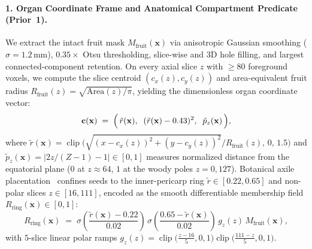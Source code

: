\documentclass[10pt,a4paper]{article}
\renewcommand{\_}{\origunderscore\allowbreak}
\begin{document}
\paragraph{1. Organ Coordinate Frame and Anatomical Compartment Predicate (Prior~1).}
We extract the intact fruit mask $M_{\text{fruit}}(\mathbf{x})$ via anisotropic Gaussian smoothing ($\sigma = 1.2\,\text{mm}$), $0.35\times$ Otsu thresholding, slice-wise and 3D hole filling, and largest connected-component retention. On every axial slice $z$ with $\ge 80$ foreground voxels, we compute the slice centroid $(c_x(z), c_y(z))$ and area-equivalent fruit radius $R_{\text{fruit}}(z) = \sqrt{\text{Area}(z)/\pi}$, yielding the dimensionless organ coordinate vector:
\begin{equation}
    \mathbf{c}(\mathbf{x}) \;=\; \Bigl(\,\tilde{r}(\mathbf{x}),\;\; (\tilde{r}(\mathbf{x}) - 0.43)^2,\;\; \tilde{p}_z(\mathbf{x})\,\Bigr),
    \label{eq:organ_gps_coords}
\end{equation}
where $\tilde{r}(\mathbf{x}) = \operatorname{clip}\bigl(\sqrt{(x - c_x(z))^2 + (y - c_y(z))^2}/R_{\text{fruit}}(z),\, 0,\, 1.5\bigr)$ and $\tilde{p}_z(\mathbf{x}) = |2z/(Z-1) - 1| \in [0, 1]$ measures normalized distance from the equatorial plane ($0$ at $z \approx 64$, $1$ at the woody poles $z=0, 127$). Botanical axile placentation~\cite{richardson2011kiwidev,guo2013kiwivascular} confines seeds to the inner-pericarp ring $\tilde{r} \in [0.22, 0.65]$ and non-polar slices $z \in [16, 111]$, encoded as the smooth differentiable membership field $R_{\text{ring}}(\mathbf{x}) \in [0, 1]$:
\begin{equation}
    R_{\text{ring}}(\mathbf{x}) \;=\; \sigma\!\left(\frac{\tilde{r}(\mathbf{x}) - 0.22}{0.02}\right)\, \sigma\!\left(\frac{0.65 - \tilde{r}(\mathbf{x})}{0.02}\right)\, g_z(z)\, M_{\text{fruit}}(\mathbf{x}),
    \label{eq:soft_ring}
\end{equation}
with $5$-slice linear polar ramps $g_z(z) = \operatorname{clip}\bigl(\frac{z - 16}{5}, 0, 1\bigr)\operatorname{clip}\bigl(\frac{111 - z}{5}, 0, 1\bigr)$.
\end{document}
